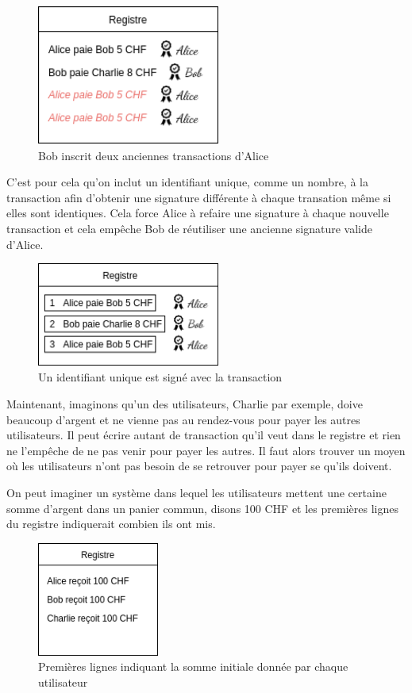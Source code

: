 \begin{figure}[H]
  \centering
  \includegraphics[width=6cm]{images/crypto_4.png}
  \caption{Bob inscrit deux anciennes transactions d'Alice}
\end{figure}

C'est pour cela qu'on inclut un identifiant unique, comme un nombre, à la transaction afin d'obtenir une signature différente à chaque transation même si elles sont identiques. Cela force Alice à refaire une signature à chaque nouvelle transaction et cela empêche Bob de réutiliser une ancienne signature valide d'Alice.

\begin{figure}[H]
  \centering
  \includegraphics[width=6cm]{images/crypto_5.png}
  \caption{Un identifiant unique est signé avec la transaction}
\end{figure}

Maintenant, imaginons qu'un des utilisateurs, Charlie par exemple, doive beaucoup d'argent et ne vienne pas au rendez-vous pour payer les autres utilisateurs. Il peut écrire autant de transaction qu'il veut dans le registre et rien ne l'empêche de ne pas venir pour payer les autres. Il faut alors trouver un moyen où les utilisateurs n'ont pas besoin de se retrouver pour payer se qu'ils doivent.

On peut imaginer un système dans lequel les utilisateurs mettent une certaine somme d'argent dans un panier commun, disons 100 CHF et les premières lignes du registre indiquerait combien ils ont mis.

\begin{figure}[H]
  \centering
  \includegraphics[width=4cm]{images/crypto_6.png}
  \caption{Premières lignes indiquant la somme initiale donnée par chaque utilisateur}
\end{figure}

